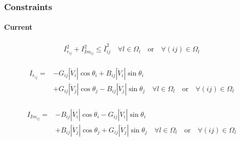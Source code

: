 \documentclass[
	11pt, %
	aspectratio=169, %
]{beamer}
\begin{document}
\begin{frame}
	\frametitle{Constraints}
	\framesubtitle{Current} %

	\begin{align}
	\label{eq:cons_current}
		I_{r_{ij}}^{2}+ I_{Im_{ij}}^{2} \leq \overline{I}_{ij}^{2} \quad   \forall l \in \Omega_{l} \quad \text{or} \quad \forall (ij) \in \Omega_{l}
	\end{align}

	\begin{align}
	\label{eq:expr_i_re}
		\begin{split}
	 		I_{r_{ij}} = &-G_{ij}\left\lvert \dot{V}_{i} \right\rvert \cos{\theta_{i}} + B_{ij}\left\lvert \dot{V}_{i} \right\rvert \sin{\theta_{i}} \\
					&+ G_{ij}\left\lvert \dot{V}_{j} \right\rvert \cos{\theta_{j}} - B_{ij}\left\lvert \dot{V}_{j} \right\rvert \sin{\theta_{j}} \quad \forall l \in \Omega_{l} \quad \text{or} \quad \forall (ij) \in \Omega_{l}
		\end{split}
	\end{align}

	\begin{align}
	\label{eq:expr_i_imag}
		\begin{split}
	 		I_{Im_{ij}} = &-B_{ij}\left\lvert \dot{V}_{i} \right\rvert \cos{\theta_{i}} - G_{ij}\left\lvert \dot{V}_{i} \right\rvert \sin{\theta_{i}} \\
			&+ B_{ij}\left\lvert \dot{V}_{j} \right\rvert \cos{\theta_{j}} + G_{ij}\left\lvert \dot{V}_{j} \right\rvert \sin{\theta_{j}} \quad \forall l \in \Omega_{l} \quad \text{or} \quad \forall (ij) \in \Omega_{l}
		\end{split}
	\end{align}

	
\end{frame}

\end{document}
